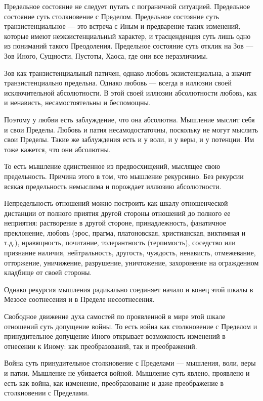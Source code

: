 Предельное состояние не следует путать с пограничной ситуацией. Предельное
состояние суть столкновение с Пределом. Предельное состояние суть
транзистенциальное — это встреча с Иным и предварение таких изменений, которые
имеют неэкзистенциальный характер, и трасценденция суть лишь одно из пониманий
такого Преодоления. Предельное состояние суть отклик на Зов — Зов Иного,
Сущности, Пустоты, Хаоса, где они все неразличимы.

Зов как транзистенциальный патичен, однако любовь экзистенциальна, а значит транзистенциально предельна. Однако любовь — всегда в иллюзии своей исключительной абсолютности. В этой своей иллюзии абсолютности любовь, как и ненависть, несамостоятельны и беспомощны.

Поэтому у любви есть заблуждение, что она абсолютна. Мышление мыслит себя и
свои Пределы. Любовь и патия несамодостаточны, поскольку не могут мыслить свои
Пределы. Такие же заблуждения есть и у воли, и у веры, и у потенции. Им тоже
кажется, что они абсолютны.

То есть мышление единственное из предвосхищений, мыслящее свою предельность.
Причина этого в том, что мышление рекурсивно. Без рекурсии всякая предельность
немыслима и порождает иллюзию абсолютности.

Непредельность отношений можно построить как шкалу отношенческой дистанции от
полного приятия другой стороны отношений до полного ее неприятия: растворение в
другой стороне, принадлежность, фанатичное преклонение, любовь (эрос, прагма,
платоновская, христианская, виктимная и т.д.), нравящность, почитание,
толерантность (терпимость), соседство или признание наличия, нейтральность,
другость, чуждость, ненависть, отмежевание, отторжение, уничижение, разрушение,
уничтожение, захоронение на огражденном кладбище от своей стороны.

Однако рекурсия мышления радикально соединяет начало и конец этой шкалы в
Мезосе соотнесения и в Пределе несоотнесения.

Свободное движение духа самостей по проявленной в мире этой шкале отношений
суть допущение войны. То есть война как столкновение с Пределом и
принудительное допущение Иного открывает возможность изменений в отнесении к
Иному: как преобразований, так и преображений.

Война суть принудительное столкновение с Пределами — мышления, воли, веры и
патии. Мышление не убивается войной. Мышление суть явлено, проявлено и есть как
война, как изменение, преобразование и даже преображение в столкновении с
Пределами.

